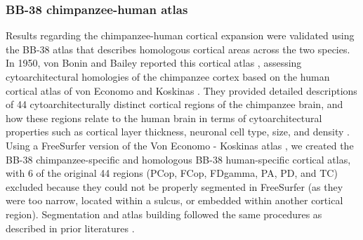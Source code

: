 \begin{refsection}
\subsubsection*{BB-38 chimpanzee-human atlas}
Results regarding the chimpanzee-human cortical expansion were validated using the BB-38 atlas that describes homologous cortical areas across the two species. In 1950, von Bonin and Bailey reported this cortical atlas \citep{Bailey1050}, assessing cytoarchitectural homologies of the chimpanzee cortex based on the human cortical atlas of von Economo and Koskinas \citep{von1925cytoarchitektonik}. They provided detailed descriptions of 44 cytoarchitecturally distinct cortical regions of the chimpanzee brain, and how these regions relate to the human brain in terms of cytoarchitectural properties such as cortical layer thickness, neuronal cell type, size, and density \citep{Bailey1050}. Using a FreeSurfer version of the Von Economo - Koskinas atlas \citep{Scholtens2015ECONOMO}, we created the BB-38 chimpanzee-specific and homologous BB-38 human-specific cortical atlas, with 6 of the original 44 regions (PCop, FCop, FDgamma, PA, PD, and TC) excluded because they could not be properly segmented in FreeSurfer (as they were too narrow, located within a sulcus, or embedded within another cortical region). Segmentation and atlas building followed the same procedures as described in prior literatures \citep{Scholtens2015ECONOMO}.


\end{refsection}
